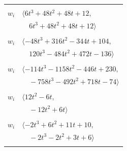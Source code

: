 \documentclass[11pt]{article}
\begin{document}
\begin{longtable}{@{}ll@{}}
\addlinespace[2pt]
\multicolumn{2}{@{}p{0.97\textwidth}@{}}{$i=5$, $D_i=2$, $\rho_{ij}$: $1{:}2, \allowbreak 2{:}2, \allowbreak 8{:}3, \allowbreak 10{:}1, \allowbreak 11{:}2, \allowbreak 15{:}1, \allowbreak 18{:}1, \allowbreak 26{:}2, \allowbreak 28{:}1, \allowbreak 36{:}3, \allowbreak 38{:}2$}\\
$w_i$ & $\langle 6t^{3}+48t^{2}+48t+12,$\\
 & $\quad 6t^{3}+48t^{2}+48t+12\rangle$\\
\addlinespace[2pt]
\multicolumn{2}{@{}p{0.97\textwidth}@{}}{$i=6$, $D_i=1$, $\rho_{ij}$: $1{:}3, \allowbreak 12{:}1, \allowbreak 14{:}3, \allowbreak 15{:}3, \allowbreak 21{:}3, \allowbreak 22{:}2, \allowbreak 30{:}1, \allowbreak 32{:}3, \allowbreak 33{:}2, \allowbreak 34{:}1, \allowbreak 41{:}3$}\\
$w_i$ & $\langle -48t^{3}+316t^{2}-344t+104,$\\
 & $\quad 120t^{3}-484t^{2}+472t-136\rangle$\\
\addlinespace[2pt]
\multicolumn{2}{@{}p{0.97\textwidth}@{}}{$i=7$, $D_i=4$, $\rho_{ij}$: $0{:}1, \allowbreak 1{:}3, \allowbreak 2{:}3, \allowbreak 10{:}2, \allowbreak 11{:}3, \allowbreak 20{:}3, \allowbreak 22{:}3, \allowbreak 25{:}3, \allowbreak 26{:}2, \allowbreak 39{:}1$}\\
$w_i$ & $\langle -114t^{3}-1158t^{2}-446t+230,$\\
 & $\quad -758t^{3}-492t^{2}+718t-74\rangle$\\
\addlinespace[2pt]
\multicolumn{2}{@{}p{0.97\textwidth}@{}}{$i=8$, $D_i=2$, $\rho_{ij}$: $4{:}3, \allowbreak 5{:}1, \allowbreak 25{:}3, \allowbreak 30{:}1, \allowbreak 41{:}2$}\\
$w_i$ & $\langle 12t^{2}-6t,$\\
 & $\quad -12t^{2}+6t\rangle$\\
\addlinespace[2pt]
\multicolumn{2}{@{}p{0.97\textwidth}@{}}{$i=9$, $D_i=2$, $\rho_{ij}$: $36{:}1, \allowbreak 39{:}3, \allowbreak 40{:}1, \allowbreak 41{:}3$}\\
$w_i$ & $\langle -2t^{3}+6t^{2}+11t+10,$\\
 & $\quad -2t^{3}-2t^{2}+3t+6\rangle$\\
\addlinespace[2pt]
\multicolumn{2}{@{}p{0.97\textwidth}@{}}{$i=10$, $D_i=8$, $\rho_{ij}$: $0{:}3, \allowbreak 4{:}2, \allowbreak 5{:}3, \allowbreak 7{:}2, \allowbreak 14{:}3, \allowbreak 18{:}2, \allowbreak 22{:}1, \allowbreak 23{:}2, \allowbreak 27{:}1, \allowbreak 28{:}1, \allowbreak 29{:}1, \allowbreak 35{:}3, \allowbreak 36{:}2, \allowbreak 37{:}3, \allowbreak 39{:}2$}\\

\end{longtable}
\end{document}
